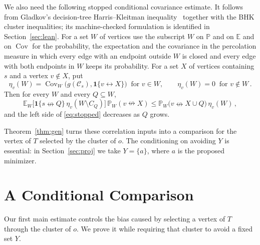 \documentclass[11pt]{article}
\theoremstyle{definition}
\theoremstyle{remark}
\newcommand{\PP}{\mathbb P}
\newcommand{\EE}{\mathbb E}
\newcommand{\one}{\mathbf 1}
\newcommand{\con}{\leftrightarrow}
\newcommand{\ncon}{\nleftrightarrow}
\newcommand{\eC}{\mathcal C}
\DeclareMathOperator{\Cov}{Cov}
\begin{document}
We also need the following stopped conditional covariance estimate. It follows from
Gladkov's decision-tree Harris--Kleitman inequality~\cite[Theorem~3.2]{Gladkov24} together
with the BHK cluster inequalities; its machine-checked formulation is identified in
Section~\ref{sec:lean}. For a set
$W$ of vertices use the subscript $W$ on $\PP$ and on $\EE$ and on $\Cov$ for the
probability, the expectation and the covariance in the percolation measure in which every edge with an endpoint outside
$W$ is closed and every edge with both endpoints in $W$ keeps its probability. For a set $X$ of
vertices containing $s$ and a vertex $v\notin X$, put
\begin{equation}\label{eq:etadef}
 \eta_v(W)=\Cov_W\bigl(g(\eC_s),\one\{v\con X\}\bigr)\ \text{ for } v\in W,
 \qquad \eta_v(W)=0\ \text{ for } v\notin W\,.
\end{equation}
Then for every $W$ and every $Q\subseteq W$,
\begin{equation}\label{eq:stopped}
 \EE_W\bigl[\one\{s\ncon Q\}\,\eta_v(W\setminus C_Q)\bigr]\,\PP_W(v\ncon X)
\leq \PP_W\bigl(v\ncon X\cup Q\bigr)\,\eta_v(W)\,,
\end{equation}
and the left side of \eqref{eq:stopped} decreases as $Q$ grows.

Theorem~\ref{thm:gen} turns these correlation inputs into a comparison for the vertex of
$T$ selected by the cluster of $o$. The conditioning on avoiding $Y$ is essential: in
Section~\ref{sec:proj} we take $Y=\{a\}$, where $a$ is the proposed minimizer.

\section{A Conditional Comparison}\label{sec:gen}

Our first main estimate controls the bias caused by selecting a vertex of $T$ through the
cluster of $o$. We prove it while requiring that cluster to avoid a fixed set $Y$.
\end{document}

